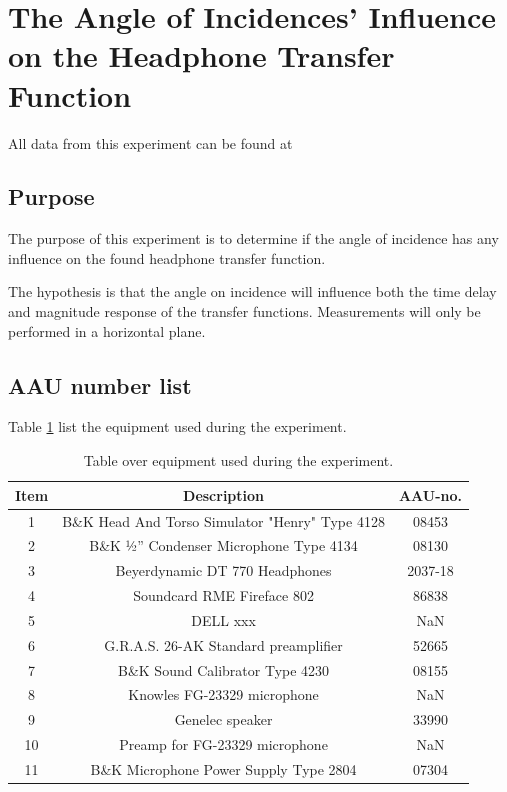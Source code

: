 
\section{The Angle of Incidences' Influence on the Headphone Transfer Function} \label{sec:AngleOfIncidence}

All data from this experiment can be found at

\subsection{Purpose}
The purpose of this experiment is to determine if the angle of incidence has any influence on the found headphone transfer function. 

The hypothesis is that the angle on incidence will influence both the time delay and magnitude response of the transfer functions. Measurements will only be performed in a horizontal plane. 

\subsection{AAU number list}

Table \ref{tab:AngleOfIncideceHP} list the equipment used during the experiment.

\begin{table}[H]
	\centering
	\begin{tabular}{ c c c } \toprule
		{Item}	& {Description} 						& {AAU-no}. \\ \bottomrule 
		1	&	B\&K Head And Torso Simulator "Henry" Type 4128	& 08453	\\
		2	&	B\&K ½'' Condenser Microphone Type 4134 	& 08130		\\
		3	&	Beyerdynamic DT 770 Headphones				& 2037-18		\\
		4	&	Soundcard RME Fireface 802					& 86838		\\
		5	&	DELL xxx									& NaN		\\
		6	&	G.R.A.S. 26-AK Standard preamplifier		& 52665		\\
		7	&	B\&K Sound Calibrator Type 4230				& 08155		\\ 
		8	&	Knowles FG-23329 microphone					& NaN		\\
		9	&	Genelec speaker								& 33990		\\ 
		10	&	Preamp for FG-23329  microphone	& NaN\\
		11	& 	B\&K Microphone Power Supply Type 2804		& 07304		\\
		\bottomrule
	\end{tabular}
	\caption{Table over equipment used during the experiment.}
	\label{tab:AngleOfIncideceHP}
\end{table}

